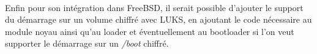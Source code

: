 \paragraph{}
Enfin pour son intégration dans FreeBSD, il serait possible d'ajouter le support
du démarrage sur un volume chiffré avec LUKS, en ajoutant le code nécessaire
au module noyau ainsi qu'au loader et éventuellement au bootloader si l'on veut
supporter le démarrage sur un {\em /boot} chiffré.


